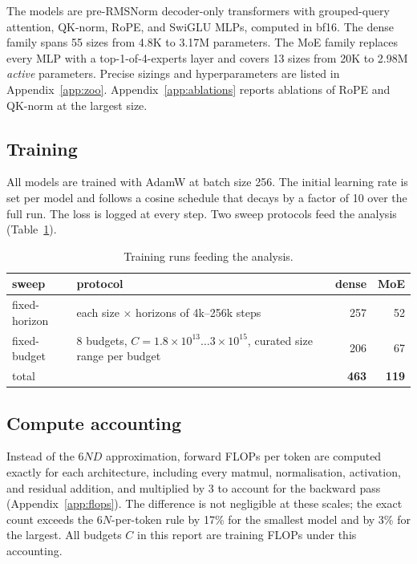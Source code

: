 \documentclass[10pt]{article}
\newcommand{\e}[1]{\times 10^{#1}}
\begin{document}
The models are pre-RMSNorm decoder-only transformers with grouped-query
attention, QK-norm, RoPE, and SwiGLU MLPs, computed in bf16. The dense
family spans 55 sizes from 4.8K to 3.17M parameters. The MoE family replaces
every MLP with a top-1-of-4-experts layer and covers 13 sizes from 20K to
2.98M \emph{active} parameters. Precise sizings and hyperparameters are
listed in Appendix~\ref{app:zoo}. Appendix~\ref{app:ablations} reports
ablations of RoPE and QK-norm at the largest size.

\subsection{Training}

All models are trained with AdamW at batch size 256. The initial learning
rate is set per model and follows a cosine schedule that decays by a factor
of 10 over the full run. The loss is logged at every step. Two sweep
protocols feed the analysis (Table~\ref{tab:sweeps}).

\begin{table}[h]
\centering
\small
\begin{tabular}{llrr}
\toprule
sweep & protocol & dense & MoE \\
\midrule
fixed-horizon & each size $\times$ horizons of 4k--256k steps & 257 & 52 \\
fixed-budget  & 8 budgets, $C = 1.8\e{13} \dots 3\e{15}$, curated size range per budget & 206 & 67 \\
\midrule
total & & \textbf{463} & \textbf{119} \\
\bottomrule
\end{tabular}
\caption{Training runs feeding the analysis.}
\label{tab:sweeps}
\end{table}

\subsection{Compute accounting}

Instead of the $6ND$ approximation, forward FLOPs per token are computed
exactly for each architecture, including every matmul, normalisation,
activation, and residual addition, and multiplied by 3 to account for the
backward pass (Appendix~\ref{app:flops}). The difference is not negligible at
these scales; the exact count exceeds the $6N$-per-token rule by 17\% for
the smallest model and by 3\% for the largest. All budgets $C$ in this report are training
FLOPs under this accounting.
\end{document}
